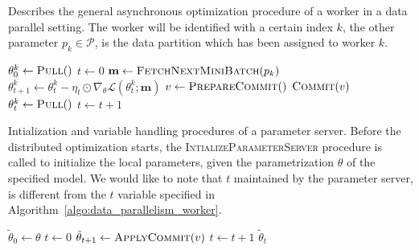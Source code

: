 \begin{algorithm}
  \caption{Describes the general asynchronous optimization procedure of a worker in a data parallel setting. The worker will be identified with a certain index $k$, the other parameter $p_k \in \mathcal{P}$, is the data partition which has been assigned to worker $k$.}
  \label{algo:data_parallelism_worker}
  \begin{algorithmic}[1]
    \State $\theta^k_0 \gets \Call{Pull}{ }$
    \State $t \gets 0$
    \State $\textbf{m} \gets \Call{FetchNextMiniBatch}{p_k}$
    \State $\theta^k_{t + 1} \gets \theta^k_t - \eta_t \odot \nabla_\theta \mathcal{L}(\theta^k_t;\textbf{m})$ 
    \State $v \gets \Call{PrepareCommit}{ }$
    \State $\Call{Commit}{v}$
    \State $\theta^k_t \gets \Call{Pull}{ }$
    \State $t \gets t + 1$
    \EndWhile
    \EndProcedure
  \end{algorithmic}
\end{algorithm}

\vspace*{3cm}

\begin{algorithm}
  \caption{Intialization and variable handling procedures of a parameter server. Before the distributed optimization starts, the \textsc{IntializeParameterServer} procedure is called to initialize the local parameters, given the parametrization $\theta$ of the specified model. We would like to note that $t$ maintained by the parameter server, is different from the $t$ variable specified in Algorithm~\ref{algo:data_parallelism_worker}.}
  \label{algo:data_parallelism_parameter_server}
  \begin{algorithmic}[1]
    \State $\tilde{\theta}_0 \gets \theta$
    \State $t \gets 0$
    \EndProcedure
    \State
    \State $\tilde{\theta}_{t + 1} \gets \Call{ApplyCommit}{v}$
    \State $t \gets t + 1$
    \EndProcedure
    \State
    \State \Return $\tilde{\theta}_t$
    \EndProcedure
  \end{algorithmic}
\end{algorithm}

\vspace*{\fill}

\newpage


